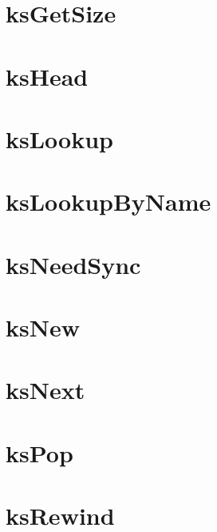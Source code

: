 \let\mypdfximage\pdfximage\def\pdfximage{\immediate\mypdfximage}\documentclass[twoside]{book}
\newcommand{\+}{\discretionary{\mbox{\scriptsize$\hookleftarrow$}}{}{}}
\begin{document}
\chapter{ks\+Get\+Size}
\label{doc_api_review_core_ksGetSize_md}

\chapter{ks\+Head}
\label{doc_api_review_core_ksHead_md}

\chapter{ks\+Lookup}
\label{doc_api_review_core_ksLookup_md}

\chapter{ks\+Lookup\+By\+Name}
\label{doc_api_review_core_ksLookupByName_md}

\chapter{ks\+Need\+Sync}
\label{doc_api_review_core_ksNeedSync_md}

\chapter{ks\+New}
\label{doc_api_review_core_ksNew_md}

\chapter{ks\+Next}
\label{doc_api_review_core_ksNext_md}

\chapter{ks\+Pop}
\label{doc_api_review_core_ksPop_md}

\chapter{ks\+Rewind}
\label{doc_api_review_core_ksRewind_md}

\end{document}
